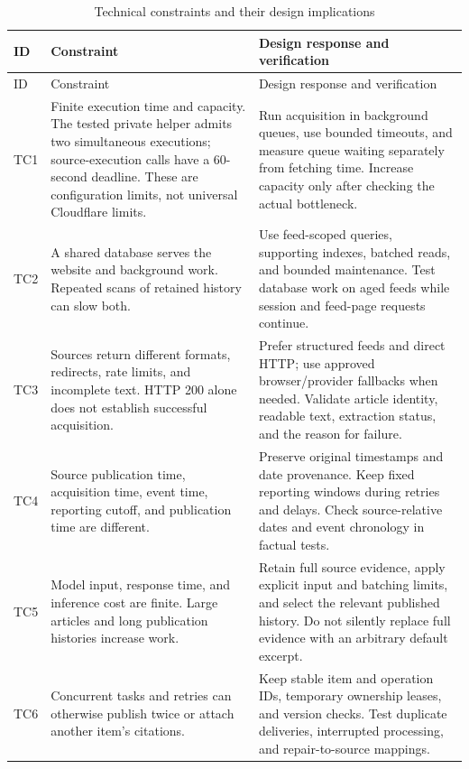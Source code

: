 \begingroup
\small
\renewcommand{\arraystretch}{1.08}
\begin{longtable}{L{1cm}L{5cm}L{\dimexpr\linewidth-6cm-6\tabcolsep\relax}}
\caption{Technical constraints and their design implications}\label{tab:techconstr}\\
\toprule ID & Constraint & Design response and verification \\ \midrule
\endfirsthead
\toprule ID & Constraint & Design response and verification \\ \midrule
\endhead
\bottomrule
\endfoot
TC1 & Finite execution time and capacity. The tested private helper admits two simultaneous executions; source-execution calls have a 60-second deadline. These are configuration limits, not universal Cloudflare limits.
& Run acquisition in background queues, use bounded timeouts, and measure queue waiting separately from fetching time. Increase capacity only after checking the actual bottleneck. \\
TC2 & A shared database serves the website and background work. Repeated scans of retained history can slow both.
& Use feed-scoped queries, supporting indexes, batched reads, and bounded maintenance. Test database work on aged feeds while session and feed-page requests continue. \\
TC3 & Sources return different formats, redirects, rate limits, and incomplete text. HTTP 200 alone does not establish successful acquisition.
& Prefer structured feeds and direct HTTP; use approved browser/provider fallbacks when needed. Validate article identity, readable text, extraction status, and the reason for failure. \\
TC4 & Source publication time, acquisition time, event time, reporting cutoff, and publication time are different.
& Preserve original timestamps and date provenance. Keep fixed reporting windows during retries and delays. Check source-relative dates and event chronology in factual tests. \\
TC5 & Model input, response time, and inference cost are finite. Large articles and long publication histories increase work.
& Retain full source evidence, apply explicit input and batching limits, and select the relevant published history. Do not silently replace full evidence with an arbitrary default excerpt. \\
TC6 & Concurrent tasks and retries can otherwise publish twice or attach another item's citations.
& Keep stable item and operation IDs, temporary ownership leases, and version checks. Test duplicate deliveries, interrupted processing, and repair-to-source mappings. \\

\end{longtable}

